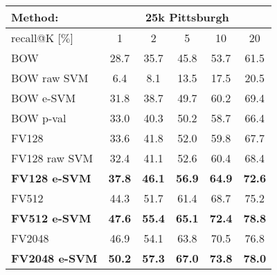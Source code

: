 
\begin{tabularx}{0.97\linewidth}{|l|c c c c c|}
  \hline 
  \rowcolor{maroon!50}
  Method: & \multicolumn{5}{c|}{25k Pittsburgh}\\
  \hline 
  \hline 
  \rowcolor{maroon!50}
  recall@K [$\%$]         & 1 & 2 & 5 & 10 & 20 \\
  \hline
  \rowcolor{maroon!10}
  BOW                     & 28.7 & 35.7 & 45.8 & 53.7 & 61.5 \\
  \rowcolor{maroon!10}
  BOW raw SVM             & 6.4  &  8.1 & 13.5 & 17.5 & 20.5 \\ 
  \rowcolor{maroon!10}
  BOW e-SVM               & 31.8 & 38.7 & 49.7 & 60.2 & 69.4 \\
  \rowcolor{maroon!10}
  BOW p-val               & 33.0 & 40.3 & 50.2 & 58.7 & 66.4 \\
  \hline
  \rowcolor{maroon!10}
  FV128                   & 33.6 & 41.8 & 52.0 & 59.8 & 67.7 \\
  \rowcolor{maroon!10}
  FV128 raw SVM           & 32.4 & 41.1 & 52.6 & 60.4 & 68.4 \\
  \rowcolor{maroon!10}
  \textbf{FV128 e-SVM}    & \textbf{37.8}  & \textbf{46.1} & \textbf{56.9} & \textbf{64.9} & \textbf{72.6}  \\
  \hline
  \rowcolor{maroon!10}
  FV512                 & 44.3 & 51.7 & 61.4 & 68.7 & 75.2 \\
  \rowcolor{maroon!10}
  \textbf{FV512 e-SVM}  & \textbf{47.6}  & \textbf{55.4} & \textbf{65.1} & \textbf{72.4} & \textbf{78.8} \\
  \hline
  \rowcolor{maroon!10}
  FV2048        & 46.9    & 54.1 & 63.8 & 70.5 & 76.8 \\
  \rowcolor{maroon!10}
  \textbf{FV2048 e-SVM}   & \textbf{50.2} & \textbf{57.3} & \textbf{67.0} & \textbf{73.8} & \textbf{78.0} \\
  \hline
\end{tabularx}